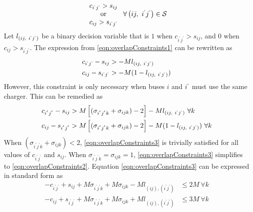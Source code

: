 \begin{equation}\label{eqn:overlapConstraints1}
	\begin{array}{c}
		c_{i^{`}j^{`}} > s_{ij} \\
		\text{or} \\
		c_{ij} > s_{i^{`}j^{`}} 
	\end{array} \ \forall \left ( ij, \ i^{`}j^{`}\right ) \in \mathcal{S}
\end{equation}
	Let $l_{\left( ij, \ i^{`}j^{`}\right )}$ be a binary decision variable that is $1$ when $c_{i^{'}j^{'}} > s_{ij}$, and $0$ when $c_{ij} > s_{i^{'}j^{'}}$. The expression from \eqref{eqn:overlapConstraints1} can be rewritten as
	\begin{equation} \label{eqn:overlapConstraints2}\begin{aligned}
	c_{i^{`}j^{`}} - s_{ij}  &> -Ml_{\left( ij, \ i^{`}j^{`}\right )} \\
	c_{ij}-s_{i^{`}j^{`}} &>  -M(1 - l_{\left( ij, \ i^{`}j^{`}\right )}) \\
\end{aligned}\end{equation}
	However, this constraint is only necessary when buses $i$ and $i^{`}$ must use the same charger. This can be remedied as
\begin{equation}\label{eqn:overlapConstraints3}\begin{aligned}
	c_{i^{'}j^{'}} - s_{ij} &> M\left[(\sigma_{i^{'}j^{'}k} + \sigma_{ijk}) - 2\right] - Ml_{\left( ij, \ i^{`}j^{`}\right )} \ \forall k \\
	c_{ij} - s_{i^{'}j^{'}} &> M\left[(\sigma_{i^{'}j^{'}k} + \sigma_{ijk}) - 2\right] - M(1 - l_{\left( ij, \ i^{`}j^{`}\right )})\ \forall k \\
\end{aligned}\end{equation}
When $(\sigma_{i^{'}j^{'}k} + \sigma_{ijk}) < 2$, \eqref{eqn:overlapConstraints3} is trivially satisfied for all values of $c_{i^{'}j^{'}}$ and $s_{ij}$. When $\sigma_{i^{'}j^{'}k} = \sigma_{ijk} = 1$, \eqref{eqn:overlapConstraints3} simplifies to \eqref{eqn:overlapConstraints2}. Equation \eqref{eqn:overlapConstraints3} can be expressed in standard form as 
	\begin{equation}\label{eqn:overlapConstraints4}\begin{aligned}
		-c_{i^{'}j^{'}} + s_{ij} + M\sigma_{i^{'}j^{'}k} + M\sigma_{ijk} - Ml_{(ij),(i^{'}j^{'})}&\le 2M  \ \forall k\\
		-c_{ij} + s_{i^{'}j^{'}} + M\sigma_{i^{'}j^{'}k} + M\sigma_{ijk} + Ml_{(ij),(i^{'}j^{'})}&\le 3M  \ \forall k\\
	\end{aligned}\end{equation}
